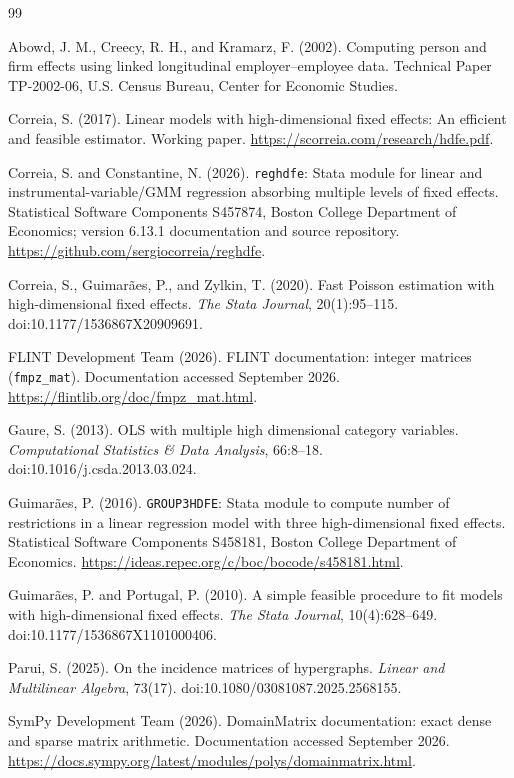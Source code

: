 \documentclass[11pt]{article}
\theoremstyle{definition}
\newcommand{\1}{\mathbf{1}}
\begin{document}
\begin{thebibliography}{99}

Abowd, J. M., Creecy, R. H., and Kramarz, F. (2002).
\newblock Computing person and firm effects using linked longitudinal employer--employee data.
\newblock Technical Paper TP-2002-06, U.S. Census Bureau, Center for Economic Studies.

Correia, S. (2017).
\newblock Linear models with high-dimensional fixed effects: An efficient and feasible estimator.
\newblock Working paper. \url{https://scorreia.com/research/hdfe.pdf}.

Correia, S. and Constantine, N. (2026).
\newblock \texttt{reghdfe}: Stata module for linear and instrumental-variable/GMM regression absorbing multiple levels of fixed effects.
\newblock Statistical Software Components S457874, Boston College Department of Economics; version 6.13.1 documentation and source repository. \url{https://github.com/sergiocorreia/reghdfe}.

Correia, S., Guimar\~aes, P., and Zylkin, T. (2020).
\newblock Fast Poisson estimation with high-dimensional fixed effects.
\newblock \emph{The Stata Journal}, 20(1):95--115. doi:10.1177/1536867X20909691.

FLINT Development Team (2026).
\newblock FLINT documentation: integer matrices (\texttt{fmpz\_mat}).
\newblock Documentation accessed September 2026. \url{https://flintlib.org/doc/fmpz_mat.html}.

Gaure, S. (2013).
\newblock OLS with multiple high dimensional category variables.
\newblock \emph{Computational Statistics \& Data Analysis}, 66:8--18. doi:10.1016/j.csda.2013.03.024.

Guimar\~aes, P. (2016).
\newblock \texttt{GROUP3HDFE}: Stata module to compute number of restrictions in a linear regression model with three high-dimensional fixed effects.
\newblock Statistical Software Components S458181, Boston College Department of Economics. \url{https://ideas.repec.org/c/boc/bocode/s458181.html}.

Guimar\~aes, P. and Portugal, P. (2010).
\newblock A simple feasible procedure to fit models with high-dimensional fixed effects.
\newblock \emph{The Stata Journal}, 10(4):628--649. doi:10.1177/1536867X1101000406.

Parui, S. (2025).
\newblock On the incidence matrices of hypergraphs.
\newblock \emph{Linear and Multilinear Algebra}, 73(17). doi:10.1080/03081087.2025.2568155.

SymPy Development Team (2026).
\newblock DomainMatrix documentation: exact dense and sparse matrix arithmetic.
\newblock Documentation accessed September 2026. \url{https://docs.sympy.org/latest/modules/polys/domainmatrix.html}.

\end{thebibliography}
\end{document}
